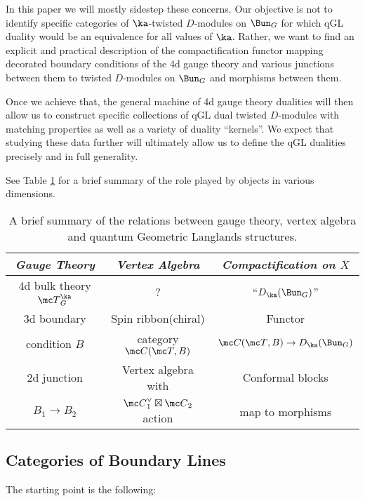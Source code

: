 \documentclass[11pt,reqno]{amsart}
\theoremstyle{plain}
\numberwithin{equation}{section}
\theoremstyle{definition}
\begin{document}
In this paper we will mostly sidestep these concerns. Our objective is
not to identify specific categories of $\ka$-twisted $D$-modules on
$\Bun_G$ for which qGL duality would be an equivalence for all values
of $\ka$. Rather, we want to find an explicit and practical
description of the compactification functor mapping decorated boundary
conditions of the 4d gauge theory and various junctions between them
to twisted $D$-modules on $\Bun_G$ and morphisms between them.

Once we achieve that, the general machine of 4d gauge theory dualities
will then allow us to construct specific collections of qGL dual
twisted $D$-modules with matching properties as well as a variety of
duality ``kernels''. We expect that studying these data further will
ultimately allow us to define the qGL dualities precisely and in full
generality.

See Table \ref{tab:one} for a brief summary of the role played by
objects in various dimensions.

\begin{table}[h]
\begin{center}
\begin{tabular}{|c||c||c|}
\hline
{\em Gauge Theory} & {\em Vertex Algebra} & {\em Compactification on $X$}  \\
\hline \hline
4d bulk theory ${\mc T}_G^\ka$ & ? & ``$D_\ka(\Bun_G)$''  \\ 
\hline
3d boundary & Spin ribbon(chiral)  & Functor  \\
condition $B$ &  category ${\mc C}({\mc T},B)$ & ${\mc C}({\mc T},B)
\to D_\ka(\Bun_G)$ \\
\hline
2d junction & Vertex algebra with & Conformal blocks  \\
$B_1 \to B_2$ & ${\mc C}^\vee_1\boxtimes {\mc C}_2$ action & map to
morphisms \\
\hline
\end{tabular} 
\end{center}
\vspace*{5mm}
\caption{A brief summary of the relations between gauge theory, vertex algebra and quantum Geometric Langlands 
structures.}\label{tab:one}
\end{table}
 
\subsection{Categories of Boundary Lines}

The starting point is the following:
\end{document}
